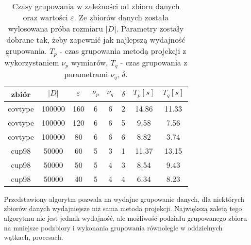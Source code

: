 \begin{table}[H]
	\centering
	\begin{tabular}{ c | c | c | c | c | c | c | c |}
		zbiór     & $ |D| $ & $ \varepsilon $ & $ \nu_p $ & $ \nu_q $ & $ \delta $ & $ T_p [s]$ & $ T_q [s]$ \\ \hline
		covtype   & 100000  & 160 & 6 & 6 & 2 & 14.86 & 11.33  \\ \hline
		covtype   & 100000  & 120 & 6 & 6 & 5 & 9.58  & 7.56   \\ \hline
		covtype   & 100000  &  80 & 6 & 6 & 6 & 8.82  & 3.74   \\ \hline
		cup98     &  50000  &  60 & 5 & 3 & 1 & 11.37 & 13.15  \\ \hline
		cup98     &  50000  &  50 & 5 & 4 & 3 & 8.54  & 9.43    \\ \hline
		cup98     &  50000  &  40 & 5 & 4 & 4 & 6.34  & 8.23    \\ \hline
	\end{tabular}
	\caption{Czasy grupowania w zależności od zbioru danych oraz wartości $ \varepsilon $. Ze zbiorów danych została wylosowana próba rozmiaru $ |D| $. Parametry zostały dobrane tak, żeby zapewnić jak najlepszą wydajność grupowania. $ T_p $ - czas grupowania metodą projekcji z wykorzystaniem $ \nu_p $ wymiarów, $ T_q $ - czas grupowania  z parametrami $ \nu_q $, $ \delta $.}\label{table:projection-vs-qscan}
\end{table}
Przedstawiony algorytm pozwala na wydajne grupowanie danych, dla niektórych zbiorów danych wydajniejsze niż sama metoda projekcji. Największą zaletą tego algorytmu nie jest jednak wydajność, ale możliwość podziału grupowanego zbioru na mniejsze podzbiory i wykonania grupowania równolegle w oddzielnych wątkach, procesach.
